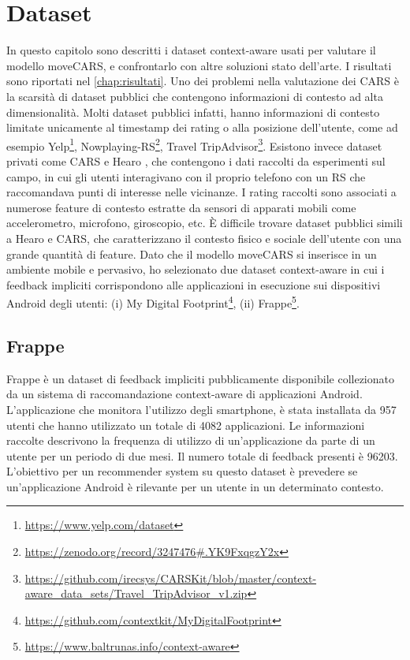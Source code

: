 \documentclass[12pt,italian]{report}
\begin{document}
% 
% 
\chapter{Dataset} \label{chap:datasets}
In questo capitolo sono descritti i dataset context-aware usati per valutare il modello moveCARS, e confrontarlo con altre soluzioni stato dell'arte. I risultati sono riportati nel \autoref{chap:risultati}. Uno dei problemi nella valutazione dei CARS è la scarsità di dataset pubblici che contengono informazioni di contesto ad alta dimensionalità. Molti dataset pubblici infatti, hanno informazioni di contesto limitate unicamente al timestamp dei rating o alla posizione dell'utente, come ad esempio Yelp\footnote{\url{https://www.yelp.com/dataset}}, Nowplaying-RS\footnote{\url{https://zenodo.org/record/3247476\#.YK9FxqgzY2x}}, Travel TripAdvisor\footnote{\url{https://github.com/irecsys/CARSKit/blob/master/context-aware_data_sets/Travel_TripAdvisor_v1.zip}}. Esistono invece dataset privati come CARS \cite{context-aware-deep-learning} e Hearo \cite{latent-context}, che contengono i dati raccolti da esperimenti sul campo, in cui gli utenti interagivano con il proprio telefono con un RS che raccomandava punti di interesse nelle vicinanze. I rating raccolti sono associati a numerose feature di contesto estratte da sensori di apparati mobili come accelerometro, microfono, giroscopio, etc.
\`E difficile trovare dataset pubblici simili a Hearo e CARS, che caratterizzano il contesto fisico e sociale dell'utente con una grande quantità di feature. Dato che il modello moveCARS si inserisce in un ambiente mobile e pervasivo, ho selezionato due dataset context-aware in cui i feedback impliciti corrispondono alle applicazioni in esecuzione sui dispositivi Android degli utenti: (i) My Digital Footprint\footnote{\url{https://github.com/contextkit/MyDigitalFootprint}}, (ii) Frappe\footnote{\url{https://www.baltrunas.info/context-aware}}.

\section{Frappe}
Frappe \cite{frappe} è un dataset di feedback impliciti pubblicamente disponibile collezionato da un sistema di raccomandazione context-aware di applicazioni Android. L'applicazione che monitora l'utilizzo degli smartphone, è stata installata da 957 utenti che hanno utilizzato un totale di 4082 applicazioni. Le informazioni raccolte descrivono la frequenza di utilizzo di un'applicazione da parte di un utente per un periodo di due mesi. Il numero totale di feedback presenti è 96203. L'obiettivo per un recommender system su questo dataset è prevedere se un'applicazione Android è rilevante per un utente in un determinato contesto.
\end{document}
